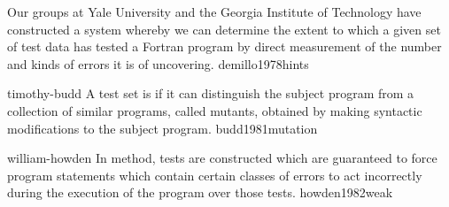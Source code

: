\documentclass{article}
\begin{document}



  {Our groups at Yale University and the Georgia Institute of Technology have constructed a system whereby we can determine the extent to which a given set of test data has  tested a Fortran program by direct measurement of the number and kinds of errors it is  of uncovering.}
  {demillo1978hints}

\lnQuote
  {timothy-budd}
  {A test set is  if it can distinguish the subject program from a collection of similar programs, called mutants, obtained by making  syntactic modifications to the subject program.}
  {budd1981mutation}


\lnQuote
  {william-howden}
  {In  method, tests are constructed which are guaranteed to force program statements which contain certain classes of errors to act incorrectly during the execution of the program over those tests.}
  {howden1982weak}
\end{document}
